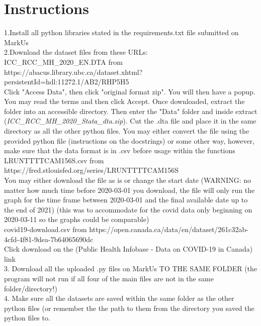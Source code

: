 \documentclass[fontsize=11pt]{article}
\begin{document}
    \section*{Instructions}

    1.Install all python libraries stated in the requirements.txt file submitted on MarkUs\\
    
    2.Download the dataset files from these URLs:\\
    
    ICC\_RCC\_MH\_2020\_EN.DTA from https://abacus.library.ubc.ca/dataset.xhtml?persistentId=hdl:11272.1/AB2/RHP5H5\\ Click "Access Data", then click "original format zip". You will then have a popup. You may read the terms and then click Accept. Once downloaded, extract the folder into an accessible directory. Then enter the "Data" folder and inside extract (\emph{ICC\_RCC\_MH\_2020\_Stata\_dta.zip}). Cut the .dta file and place it in the same directory as all the other python files. You may either convert the file using the provided python file (instructions on the docstrings) or some other way, however, make sure that the data format is in .csv before usage within the functions\\

    LRUNTTTTCAM156S.csv from https://fred.stlouisfed.org/series/LRUNTTTTCAM156S\\
    You may either download the file as is or change the start date (WARNING: no matter how much time before 2020-03-01 you download, the file will only run the graph for the time frame between 2020-03-01 and the final available date up to the end of 2021) (this was to accommodate for the covid data only beginning on 2020-03-11 so the graphs could be comparable)
    \\

    covid19-download.csv from https://open.canada.ca/data/en/dataset/261c32ab-4cfd-4f81-9dea-7b64065690dc \\
    Click download on the (Public Health Infobase - Data on COVID-19 in Canada) link\\

    3. Download all the uploaded .py files on MarkUs TO THE SAME FOLDER (the program will not run if all four of the main files are not in the same folder/directory!)\\

    4. Make sure all the datasets are saved within the same folder as the other python files (or remember the the path to them from the directory you saved the python files to.\\
\end{document}
